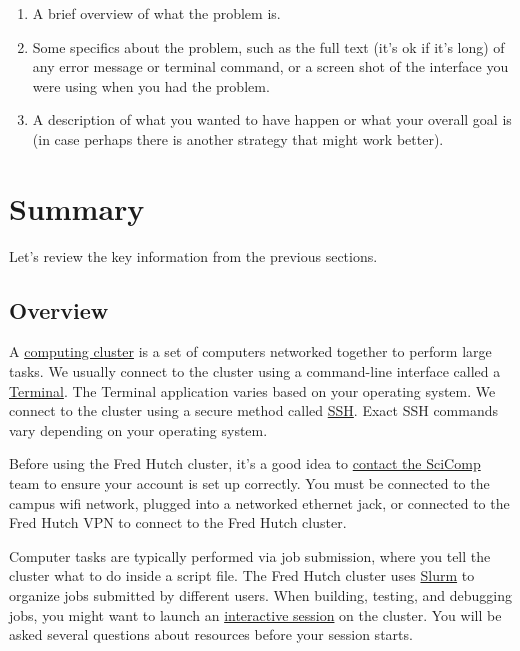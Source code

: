 \documentclass[
]{book}
\providecommand{\tightlist}{%
  \setlength{\itemsep}{0pt}\setlength{\parskip}{0pt}}
\begin{document}
\begin{enumerate}
\def\labelenumi{\arabic{enumi}.}
\tightlist
\item
  A brief overview of what the problem is.
\item
  Some specifics about the problem, such as the full text (it's ok if it's long) of any error message or terminal command, or a screen shot of the interface you were using when you had the problem.
\item
  A description of what you wanted to have happen or what your overall goal is (in case perhaps there is another strategy that might work better).
\end{enumerate}

\hypertarget{summary}{%
\chapter{Summary}\label{summary}}

Let's review the key information from the previous sections.

\hypertarget{overview}{%
\section{Overview}\label{overview}}

A \protect\hyperlink{what-is-a-cluster}{computing cluster} is a set of computers networked together to perform large tasks. We usually connect to the cluster using a command-line interface called a \protect\hyperlink{terminal}{Terminal}. The Terminal application varies based on your operating system. We connect to the cluster using a secure method called \protect\hyperlink{logging-in}{SSH}. Exact SSH commands vary depending on your operating system.

Before using the Fred Hutch cluster, it's a good idea to \protect\hyperlink{account-setup}{contact the SciComp} team to ensure your account is set up correctly. You must be connected to the campus wifi network, plugged into a networked ethernet jack, or connected to the Fred Hutch VPN to connect to the Fred Hutch cluster.

Computer tasks are typically performed via job submission, where you tell the cluster what to do inside a script file. The Fred Hutch cluster uses \protect\hyperlink{submit-your-first-job}{Slurm} to organize jobs submitted by different users. When building, testing, and debugging jobs, you might want to launch an \protect\hyperlink{interactive-session}{interactive session} on the cluster. You will be asked several questions about resources before your session starts.
\end{document}
